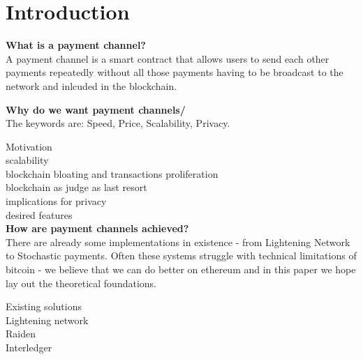 \section*{Introduction}\label{section:intro}


\textbf{What is a payment channel?}\\
A payment channel is a smart contract that allows users to send each other payments repeatedly without all those payments having to be broadcast to the network and inlcuded in the blockchain.

\textbf{Why do we want payment channels/}\\
The keywords are: Speed, Price, Scalability, Privacy.

Motivation\\

scalability\\
blockchain bloating and transactions proliferation\\
blockchain as judge as last resort\\
implications for privacy\\
desired features\\


\textbf{How are payment channels achieved?}\\
There are already some implementations in existence - from Lightening Network to Stochastic payments. Often these systems struggle with technical limitations of bitcoin - we believe that we can do better on ethereum and in this paper we hope lay out the theoretical foundations.

Existing solutions\\

Lightening network\\
Raiden\\
Interledger
